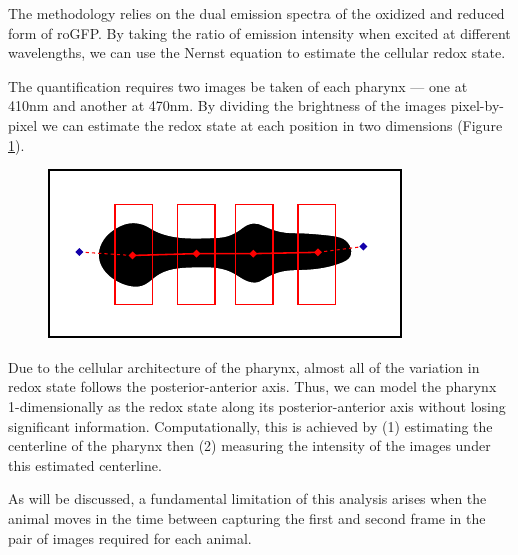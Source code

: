The methodology relies on the dual emission spectra of the oxidized and reduced form of roGFP. By taking the ratio of emission intensity when excited at different wavelengths, we can use the Nernst equation to estimate the cellular redox state.

The quantification requires two images be taken of each pharynx --- one at 410nm and another at 470nm. By dividing the brightness of the images pixel-by-pixel we can estimate the redox state at each position in two dimensions (Figure \ref{fig:ratioImageToE}).

\begin{figure}[ht]
    \centering
    \includegraphics[scale=1.5]{Figures/rendered_files/old_midline_algorithm}
    \decoRule
    \caption[Ratios of images to redox state]{}
    \label{fig:ratioImageToE}
\end{figure}


Due to the cellular architecture of the pharynx, almost all of the variation in redox state follows the posterior-anterior axis. Thus, we can model the pharynx 1-dimensionally as the redox state along its posterior-anterior axis without losing significant information. Computationally, this is achieved by (1) estimating the centerline of the pharynx then (2) measuring the intensity of the images under this estimated centerline.

As will be discussed, a fundamental limitation of this analysis arises when the animal moves in the time between capturing the first and second frame in the pair of images required for each animal. 

